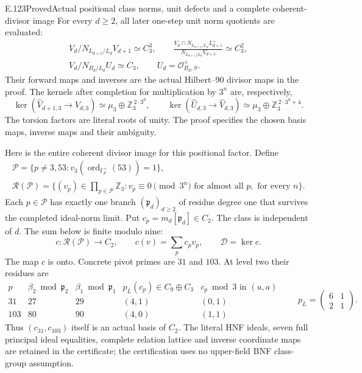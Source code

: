 \begin{statement}{E.123}{Proved}{Actual positional class norms, unit defects and a complete coherent-divisor image}
For every $d\ge2$, all later one-step unit norm quotients are evaluated:
\[
 \begin{gathered}
 V_d/N_{L_{d+1}/L_d}V_{d+1}\simeq C_3^3,\qquad
 \frac{V_d\cap N_{L_{d+1}/L_d}L_{d+1}^{\times}}
      {N_{L_{d+1}/L_d}V_{d+1}}\simeq C_3^2,\\
 V_d/N_{B_d/L_d}U_d\simeq C_3,\qquad
 U_d=\mathcal O_{B_d,S}^{\times}.
 \end{gathered}
 \tag{E123.4}
\]
Their forward maps and inverses are the actual Hilbert--90 divisor
maps in the proof. The kernels after completion for multiplication by
$3^n$ are, respectively,
\[
 \ker(\widehat V_{d+1,3}\to\widehat V_{d,3})
       \simeq\mu_3\oplus\mathbb Z_3^{\,2\cdot3^d},
 \qquad
 \ker(\widehat U_{d,3}\to\widehat V_{d,3})
       \simeq\mu_3\oplus\mathbb Z_3^{\,2\cdot3^d+4}.
 \tag{E123.5}
\]
The torsion factors are literal roots of unity. The proof specifies
the chosen basis maps, inverse maps and their ambiguity.

Here is the entire coherent divisor image for this positional factor.
Define
\[
 \begin{gathered}
 \mathcal P=\{p\ne3,53:v_3(\operatorname{ord}_{\mathbb F_p^\times}(53))=1\},\\
 \mathcal R(\mathcal P)=
 \{(v_p)\in\textstyle\prod_{p\in\mathcal P}\mathbb Z_3:
       v_p\equiv0\pmod{3^n}\text{ for almost all }p,\text{ for every }n\}.
 \end{gathered}
 \tag{E123.6}
\]
Each $p\in\mathcal P$ has exactly one branch
$(\mathfrak p_d)_{d\ge2}$ of residue degree one that survives the
completed ideal-norm limit. Put $c_p=m_d[\mathfrak p_d]\in C_2$.
The class is independent of $d$. The sum below is finite modulo nine:
\[
 c:\mathcal R(\mathcal P)\longrightarrow C_2,\qquad
 c(v)=\sum_pc_pv_p,\qquad
 \mathcal D=\ker c.
 \tag{E123.7}
\]
The map $c$ is onto. Concrete pivot primes are $31$ and $103$.
At level two their residues are
\[
 \begin{array}{c|cc|cc}
 p&\beta_2\bmod\mathfrak p_2&\beta_1\bmod\mathfrak p_1&
 p_L(c_p)\in C_9\oplus C_3&c_p\bmod3\text{ in }(u,a)\\ \hline
 31&27&29&(4,1)&(0,1)\\
 103&80&90&(4,0)&(1,1)
 \end{array}
 \qquad p_L=\begin{pmatrix}6&1\\2&1\end{pmatrix}.
 \tag{E123.8}
\]
Thus $(c_{31},c_{103})$ itself is an actual basis of $C_2$.
The literal HNF ideals, seven full principal ideal equalities,
complete relation lattice and inverse coordinate maps are retained
in the certificate; the certification uses no upper-field BNF
class-group assumption.


\end{statement}

